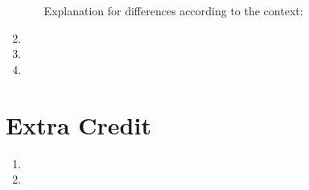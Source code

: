 \documentclass{article}
\begin{document}
\begin{enumerate}
\begin{enumerate}
		Explanation for differences according to the context:
	\end{enumerate}
	\item 
	\item
	\item 
\end{enumerate}
\pagebreak

\label{Extra Credit}
\section{Extra Credit}
\begin{enumerate}
	\item
	\item 
\end{enumerate}
\end{document}
